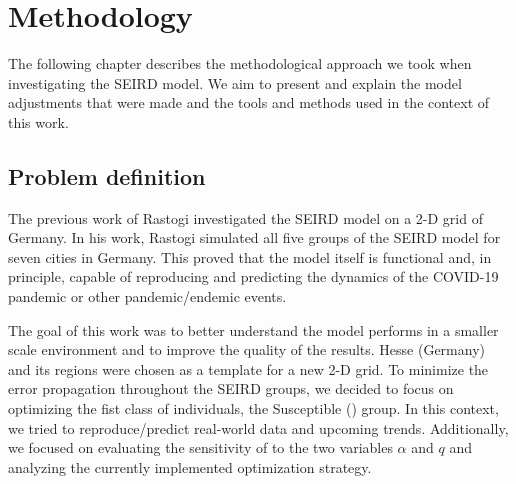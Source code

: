 
\chapter{Methodology} %
\label{chap:methodology} %
The following chapter describes the methodological approach we took when investigating the SEIRD model. We aim to
present and explain the model adjustments that were made and the tools and methods used in the context of this work.


\section{Problem definition}
\label{sec:problemDef}

The previous work of Rastogi \cite{Rastogi} investigated the SEIRD model on a 2-D grid of Germany. In his work, Rastogi simulated
all five groups of the SEIRD model for seven cities in Germany. This proved that the model itself is functional and,
in principle, capable of reproducing and predicting the dynamics of the COVID-19 pandemic or other pandemic/endemic events. \newline

\par
The goal of this work was to better understand the model performs in a smaller scale environment and to improve
the quality of the results. Hesse (Germany) and its regions were chosen as a template for a new 2-D grid. To minimize the
error propagation throughout the SEIRD groups, we decided to focus on optimizing the fist class of individuals, the Susceptible () group.
In this context, we tried to reproduce/predict real-world data and upcoming trends. Additionally, we focused on evaluating the
sensitivity of  to the two variables $\alpha$ and $q$ and analyzing the currently implemented optimization strategy.

